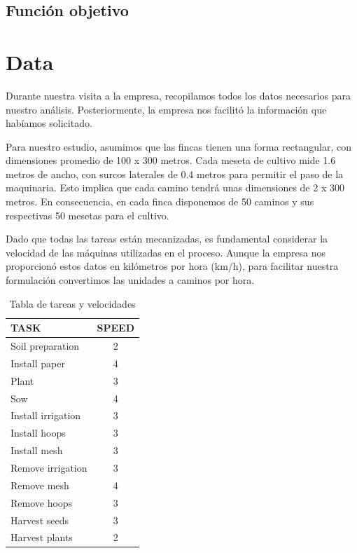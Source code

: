 \section*{Función objetivo}




\chapter*{Data}

Durante nuestra visita a la empresa, recopilamos todos los datos necesarios para nuestro análisis. 
Posteriormente, la empresa nos facilitó la información que habíamos solicitado.

Para nuestro estudio, asumimos que las fincas tienen una forma rectangular, con dimensiones promedio
 de 100 x 300 metros. Cada meseta de cultivo mide 1.6 metros de ancho, con surcos laterales de 0.4 metros
  para permitir el paso de la maquinaria. Esto implica que cada camino tendrá unas dimensiones de 2 x 300 metros.
   En consecuencia, en cada finca disponemos de 50 caminos y sus respectivas 50 mesetas para el cultivo.

Dado que todas las tareas están mecanizadas, es fundamental considerar la velocidad de las máquinas utilizadas en el
 proceso. Aunque la empresa nos proporcionó estos datos en kilómetros por hora (km/h), para facilitar nuestra formulación 
 convertimos las unidades a caminos por hora.
 
 \begin{table}[ht!]
    \centering
    \begin{tabular}{|l|c|}
        \hline
        \rowcolor{gray!30} \textbf{\textcolor{grey3}{TASK}} & \textbf{\textcolor{grey3}{SPEED}} \\ 
        \hline
        Soil preparation   & 2  \\ \hline
        Install paper      & 4  \\ \hline
        Plant              & 3  \\ \hline
        Sow                & 4  \\ \hline
        Install irrigation & 3  \\ \hline
        Install hoops      & 3  \\ \hline
        Install mesh       & 3  \\ \hline
        Remove irrigation  & 3  \\ \hline
        Remove mesh        & 4  \\ \hline
        Remove hoops       & 3  \\ \hline
        Harvest seeds      & 3  \\ \hline
        Harvest plants     & 2  \\ 
        \hline
    \end{tabular}
    \caption{Tabla de tareas y velocidades}
    \label{tab:tareas}
\end{table}


